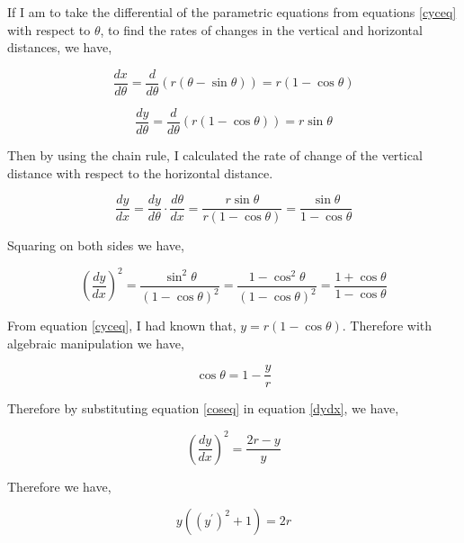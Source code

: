 

{If I am to take the differential of the parametric equations from equations \ref{cyceq} with respect to $\theta$, to find the rates of changes in the vertical and horizontal distances, we have,}

	$$\frac{dx}{d\theta} = \frac{d}{d\theta}\left(r\left(\theta - \sin\theta\right)\right) = r\left(1 - \cos\theta\right)$$

	$$\frac{dy}{d\theta} = \frac{d}{d\theta}\left(r\left(1 - \cos\theta\right)\right) = r\sin\theta$$

{Then by using the chain rule, I calculated the rate of change of the vertical distance with respect to the horizontal distance.}

	$$\frac{dy}{dx} = \frac{dy}{d\theta}\cdot\frac{d\theta}{dx} = \frac{r\sin\theta}{r\left(1 - \cos\theta\right)} = \frac{\sin\theta}{1 - \cos\theta}$$

{Squaring on both sides we have,}

	\begin{equation}
		\left(\frac{dy}{dx}\right)^2 = \frac{\sin^2\theta}{\left(1 - \cos\theta\right)^2} = \frac{1 - \cos^2\theta}{\left(1 - \cos\theta\right)^2} = \frac{1 + \cos\theta}{1 - \cos\theta}
		\label{dydx}
	\end{equation}

{From equation \ref{cyceq}, I had known that, $y = r\left(1 - \cos\theta\right)$. Therefore with algebraic manipulation we have,}

	\begin{equation}
		\cos\theta = 1 -\frac{y}{r}
		\label{coseq}
	\end{equation}

{Therefore by substituting equation \ref{coseq} in equation \ref{dydx}, we have,}

	\begin{equation}
		\left(\frac{dy}{dx}\right)^2 = \frac{2r - y}{y}
		\label{dydxry}
	\end{equation}

{Therefore we have,}

	$$y\left(\left(y^{\prime}\right)^2 + 1\right) = 2r$$


